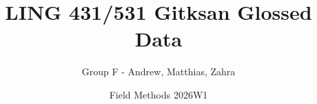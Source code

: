 \documentclass{article}
\begin{document}
\title{LING 431/531 Gitksan Glossed Data}
\author{Group F - Andrew, Matthias, Zahra}
\date{Field Methods 2026W1}
\maketitle

\pagestyle{fancyplain}



\tableofcontents
\newpage

\lhead{}

\vspace{-3cm}
\printglossaries
\newpage

\fancyhead[L]{\nouppercase{\rightmark}}
\fancyhead[R]{\nouppercase{\leftmark}}



\newpage


\newpage


\newpage


\newpage


\newpage


\newpage


\newpage


\newpage
\printbibliography
\end{document}
